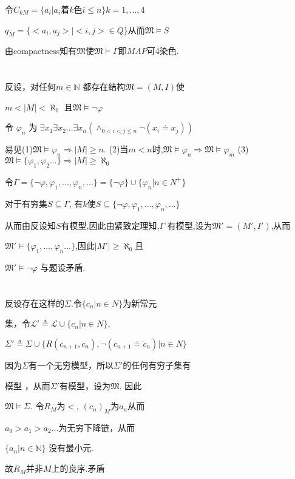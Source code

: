 \documentclass{article}
\begin{document}
令$C_{kM}=\{a_i|a_i$着$k$色$i\leq n\}k=1,...,4$

$q_M =\{<a_i,a_j>|<i,j>\in Q\}$从而$\mathfrak{M} \vDash S$

由compactness知有$\mathfrak{M}$使$\mathfrak{M}\vDash \Gamma $即$MAP$可4染色.

\section{}
反设，对任何$m\in \mathbb{N}$ 都存在结构$\mathfrak{M}=(M,I)$使

$m <|M| < \aleph_0$ 且$\mathfrak{M}\vDash \neg  \varphi $

令 $\varphi_n$ 为 $\exists x_1 \exists x_2 ... \exists x_n (\wedge_{0<i<j\leq n}\neg (x_i \doteq x_j))$

易见(1)$ \mathfrak{M}\vDash \varphi_n \Rightarrow |M|\geq n$. (2)当$m<n$时,$\mathfrak{M}\vDash \varphi_n \Rightarrow \mathfrak{M}\vDash \varphi_m$ 
(3)$\mathfrak{M}\vDash \{\varphi_1,\varphi_2...\} \Rightarrow |M|\geq \aleph_0$

令$\Gamma =\{ \neg  \varphi, \varphi_1, ..., \varphi_n ,...\} = \{ \neg \varphi \}\cup \{\varphi_n |n \in N^+\}$

对于有穷集$S \subseteq \Gamma$, 有$k$使$S\subseteq \{ \neg  \varphi, \varphi_1, ..., \varphi_n ,...\} $

从而由反设知$S$有模型,因此由紧致定理知,$\Gamma$ 有模型,设为$\mathfrak{M'} = (M',I')$,从而

$\mathfrak{M'}\vDash \{\varphi_1, ..., \varphi_n...\}$,因此$|M'|\geq \aleph_0$且

$\mathfrak{M'} \vDash \neg \varphi$ 与题设矛盾.


\section{}

反设存在这样的$\Sigma$.令$\{c_n|n \in N\}$为新常元

集，令$\mathscr{L'}\triangleq \mathscr{L} \cup \{c_n | n \in N\}$,

$\Sigma' \triangleq \Sigma \cup \{R (c_{n+1},c_n),\neg (c_{n+1}\doteq c_n)| n\in N\}$


因为$\Sigma$有一个无穷模型，所以$\Sigma'$的任何有穷子集有

模型 ，从而$\Sigma'$有模型，设为$\mathfrak{M}$. 因此

$\mathfrak{M} \vDash \Sigma$. 令$R_M$为$<$, $(c_n)_M$为$a_n$从而

$a_0>a_1>a_2...$为无穷下降链，从而

$\{a_n | n \in \mathbb{N}\}$ 没有最小元.

故$R_M$并非$M$上的良序.矛盾
\end{document}
